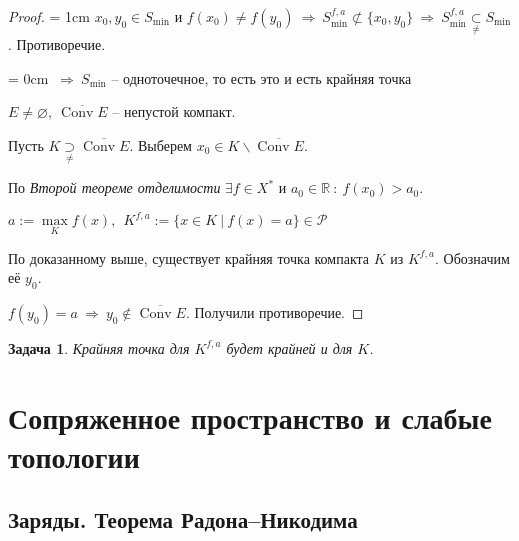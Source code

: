 \documentclass[12pt,a4paper]{report}
\DeclareMathOperator*{\Conv}{Conv}
\newcommand{\then}{\ \Longrightarrow \ }
\newcommand{\R}{\mathbb{R}}
\newcommand{\empt}{\varnothing}
\newtheorem{exer}{Задача}
\begin{document}
\begin{proof}
\parindent = 1cm
$x_0, y_0 \in S_{\text{min}}$ и $f(x_0) \neq f(y_0) \then
 S_{\text{min}}^{f,a} \not\subset \{x_0, y_0 \} \then  S_{\text{min}}^{f,a} \underset{\neq}{\subset}  S_{\text{min}}$. Противоречие.
 
\parindent = 0cm
 $\then  S_{\text{min}}$ -- одноточечное, то есть это и есть крайняя точка

$E \neq \empt, \ \overline{\Conv E}$ -- непустой компакт.

Пусть $K \underset{\neq}{\supset} \overline{\Conv E}$. Выберем $x_0 \in K \smallsetminus \overline{\Conv E}$.

По \textit{Второй теореме отделимости} $\exists f \in X^*$ и $a_0 \in \R \ : \ f(x_0) > a_0$.

$a := \max\limits_{K} f(x), \ \ K^{f,a} := \{ x \in K \ \big| \ f(x) = a \} \in \mathcal{P}$

По доказанному выше, существует крайняя точка компакта $K$ из $K^{f,a}$. Обозначим её $y_0$.

$f(y_0) = a \then y_0 \not\in \overline{\Conv E}$. Получили противоречие.
\end{proof}

\begin{exer}
Крайняя точка для $K^{f,a}$ будет крайней и для $K$.
\end{exer}

\chapter{Сопряженное пространство и слабые топологии}

\section{Заряды. Теорема Радона--Никодима}
\end{document}
